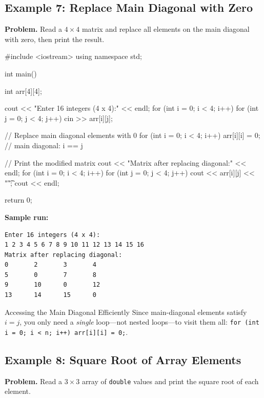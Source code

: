 \subsection{Example 7: Replace Main Diagonal with Zero}

\textbf{Problem.} Read a $4 \times 4$ matrix and replace all elements
on the main diagonal with zero, then print the result.

\begin{cppcode}
#include <iostream>
using namespace std;

int main() {
    int arr[4][4];

    cout << "Enter 16 integers (4 x 4):" << endl;
    for (int i = 0; i < 4; i++)
        for (int j = 0; j < 4; j++)
            cin >> arr[i][j];

    // Replace main diagonal elements with 0
    for (int i = 0; i < 4; i++) {
        arr[i][i] = 0;   // main diagonal: i == j
    }

    // Print the modified matrix
    cout << "Matrix after replacing diagonal:"
         << endl;
    for (int i = 0; i < 4; i++) {
        for (int j = 0; j < 4; j++) {
            cout << arr[i][j] << "\t";
        }
        cout << endl;
    }

    return 0;
}
\end{cppcode}

\textbf{Sample run:}
\begin{verbatim}
Enter 16 integers (4 x 4):
1 2 3 4 5 6 7 8 9 10 11 12 13 14 15 16
Matrix after replacing diagonal:
0       2       3       4
5       0       7       8
9       10      0       12
13      14      15      0
\end{verbatim}

\begin{infobox}{Accessing the Main Diagonal Efficiently}
Since main-diagonal elements satisfy $i = j$, you only need a
\emph{single} loop---not nested loops---to visit them all:
\texttt{for (int i = 0; i < n; i++) arr[i][i] = 0;}.
\end{infobox}

\subsection{Example 8: Square Root of Array Elements}

\textbf{Problem.} Read a $3 \times 3$ array of \texttt{double} values
and print the square root of each element.

